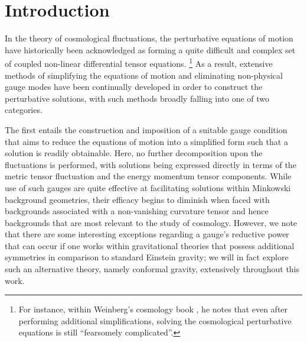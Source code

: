 
\chapter{Introduction}
\label{c:introduction}

In the theory of cosmological fluctuations, the perturbative equations of motion have historically been acknowledged as forming a quite difficult and complex set of coupled non-linear differential tensor equations. 
\renewcommand{\baselinestretch}{1}
\footnote{For instance, within Weinberg's cosmology book \cite{weinberg_2008}, he notes that even after performing additional simplifications, solving the cosmological perturbative equations is still ``fearsomely complicated''.}
As a result, extensive methods of simplifying the equations of motion and eliminating non-physical gauge modes have been continually developed in order to construct the perturbative solutions, with such methods broadly falling into one of two categories. 

The first entails the construction and imposition of a suitable gauge condition that aims to reduce the equations of motion into a simplified form such that a solution is readily obtainable. Here, no further decomposition upon the fluctuations is performed, with solutions being expressed directly in terms of the metric tensor fluctuation and the energy momentum tensor components. While use of such gauges are quite effective at facilitating solutions within Minkowski background geometries, their efficacy begins to diminish when faced with backgrounds associated with a non-vanishing curvature tensor and hence backgrounds that are most relevant to the study of cosmology. However, we note that there are some interesting exceptions regarding a gauge's reductive power that can occur if one works within gravitational theories that possess additional symmetries in comparison to standard Einstein gravity; we will in fact explore such an alternative theory, namely conformal gravity, extensively throughout this work. 

